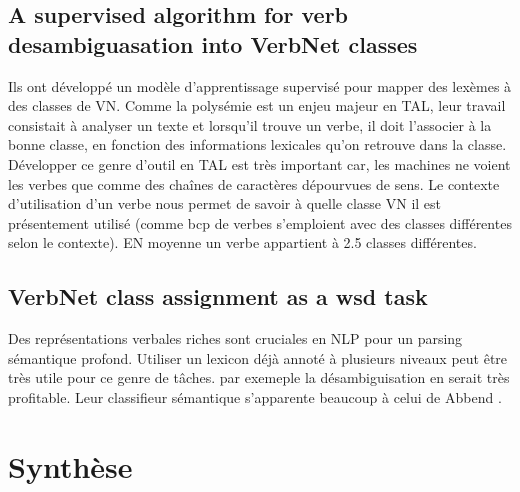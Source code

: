 \subsection{A supervised algorithm for verb desambiguasation into VerbNet classes}
\citep{AbendSupervisedAlgorithmVerb2008}
Ils ont développé un modèle d'apprentissage supervisé pour mapper des lexèmes à des classes de VN. Comme la polysémie est un enjeu majeur en TAL, leur travail consistait à analyser un texte et lorsqu'il trouve un verbe, il doit l'associer à la bonne classe, en fonction des informations lexicales qu'on retrouve dans la classe. Développer ce genre d'outil en TAL est très important car, les machines ne voient les verbes que comme des chaînes de caractères dépourvues de sens. Le contexte d'utilisation d'un verbe nous permet de savoir à quelle classe VN il est présentement utilisé (comme bcp de verbes s'emploient avec des classes différentes selon le contexte). EN moyenne un verbe appartient à 2.5 classes différentes.

\subsection{VerbNet class assignment as a wsd task}
\citep{BrownVerbNetClassAssignment2011}
Des représentations verbales riches sont cruciales en NLP pour un parsing sémantique profond. Utiliser un lexicon déjà annoté à plusieurs niveaux peut être très utile pour ce genre de tâches. par exemeple la désambiguisation en serait très profitable. Leur classifieur sémantique s'apparente beaucoup à celui de Abbend \citep{AbendSupervisedAlgorithmVerb2008}.

\section{Synthèse}


